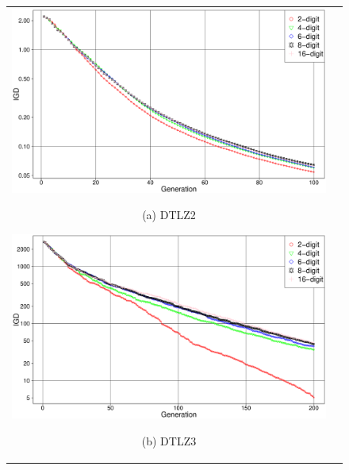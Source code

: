 \documentclass[../main/main]{subfiles}
\begin{document}
\begin{description}
\begin{figure}[htbp]
\begin{tabular}{cc}
\begin{minipage}{0.32\hsize}
\includegraphics[width=1\linewidth]{../figures/DTLZ2_IGD.eps}
\begin{center}
{\footnotesize (a) DTLZ2}
\end{center}
\end{minipage}
\begin{minipage}{0.32\hsize}
\includegraphics[width=1\linewidth]{../figures/DTLZ3_IGD_pre.eps}
\begin{center}
{\footnotesize (b) DTLZ3}
\end{center}
\end{minipage}
\begin{minipage}{0.32\hsize}

\end{minipage}
\end{tabular}
\end{figure}
\end{description}
\end{document}
